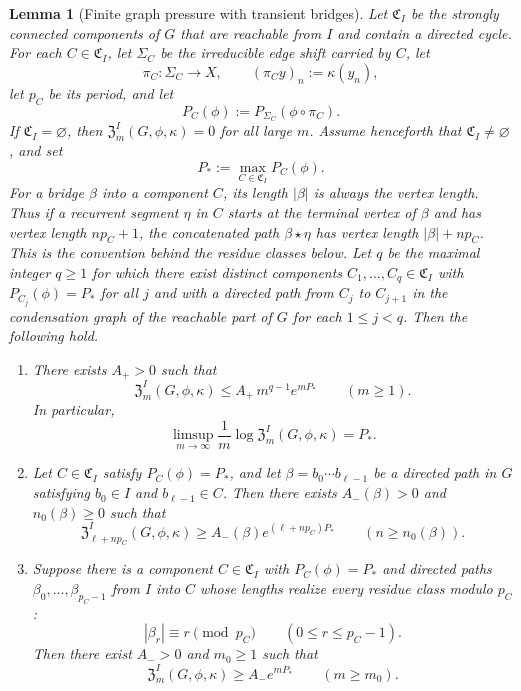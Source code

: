 \documentclass{etds}%
\numberwithin{equation}{section}
\theoremstyle{plain}
\newtheorem{lemma}[theorem]{Lemma}
\theoremstyle{definition}
\theoremstyle{remark}
\begin{document}
\begin{lemma}[Finite graph pressure with transient bridges]
Let $\mathfrak{C}_I$ be the strongly connected components of $G$ that are
reachable from $I$ and contain a directed cycle.  For each
$C\in\mathfrak{C}_I$, let $\Sigma_C$ be the irreducible edge shift carried by
$C$, let
\[
\pi_C:\Sigma_C\to X,
\qquad
(\pi_C y)_n:=\kappa(y_n),
\]
let $p_C$ be its period, and let
\[
P_C(\phi):=P_{\Sigma_C}(\phi\circ\pi_C).
\]
If $\mathfrak{C}_I=\varnothing$, then
$\mathfrak{Z}_m^I(G,\phi,\kappa)=0$ for all large $m$.  Assume henceforth that
$\mathfrak{C}_I\neq\varnothing$, and set
\[
P_*:=\max_{C\in\mathfrak{C}_I}P_C(\phi).
\]
For a bridge $\beta$ into a component $C$, its length $|\beta|$ is always the
vertex length.  Thus if a recurrent segment $\eta$ in $C$ starts at the
terminal vertex of $\beta$ and has vertex length $np_C+1$, the concatenated
path $\beta\star\eta$ has vertex length $|\beta|+np_C$.  This is the
convention behind the residue classes below.
Let $q$ be the maximal integer $q\ge 1$ for which there exist distinct
components $C_1,\dots,C_q\in\mathfrak{C}_I$ with
$P_{C_j}(\phi)=P_*$ for all $j$ and with a directed path from $C_j$ to
$C_{j+1}$ in the condensation graph of the reachable part of $G$ for each
$1\le j<q$.
Then the following hold.
\begin{enumerate}[label=(\roman*)]
\item There exists $A_+>0$ such that
  \[
  \mathfrak{Z}_m^I(G,\phi,\kappa)
  \le A_+\,m^{q-1}e^{mP_*}
  \qquad(m\ge 1).
  \]
  In particular,
  \[
  \limsup_{m\to\infty}\frac1m
  \log\mathfrak{Z}_m^I(G,\phi,\kappa)=P_*.
  \]
\item Let $C\in\mathfrak{C}_I$ satisfy $P_C(\phi)=P_*$, and let
  $\beta=b_0\cdots b_{\ell-1}$ be a directed path in $G$ satisfying
  $b_0\in I$ and $b_{\ell-1}\in C$.  Then there exists
  $A_-(\beta)>0$ and $n_0(\beta)\ge 0$ such that
  \[
  \mathfrak{Z}_{\ell+np_C}^I(G,\phi,\kappa)
  \ge A_-(\beta)e^{(\ell+np_C)P_*}
  \qquad(n\ge n_0(\beta)).
  \]
\item Suppose there is a component $C\in\mathfrak{C}_I$ with
  $P_C(\phi)=P_*$ and directed paths
  $\beta_0,\dots,\beta_{p_C-1}$ from $I$ into $C$ whose lengths realize every
  residue class modulo $p_C$:
  \[
  |\beta_r|\equiv r \pmod{p_C}
  \qquad(0\le r\le p_C-1).
  \]
  Then there exist $A_->0$ and $m_0\ge 1$ such that
  \[
  \mathfrak{Z}_m^I(G,\phi,\kappa)\ge A_-e^{mP_*}
  \qquad(m\ge m_0).
  \]
\end{enumerate}
\end{lemma}
\end{document}
